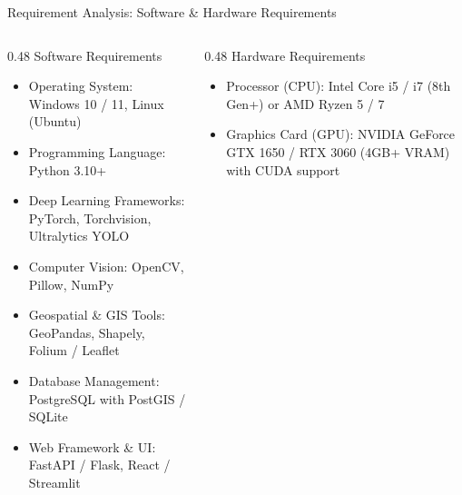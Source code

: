 \documentclass[10pt]{beamer}
\def\\{}%
\def\textbf#1{#1}%
\def\large{}%
\def\begin#1{}%
\def\end#1{}%
\def\vspace#1{}%
\begin{document}
\begin{frame}{Requirement Analysis: Software \& Hardware Requirements}
    \begin{columns}[t]
        \begin{column}{0.48\textwidth}
            \textbf{\large Software Requirements}
            \vspace{0.4em}
            \begin{itemize}
                \setlength{\itemsep}{0.45em}
                \item \textbf{Operating System:} \\ Windows 10 / 11, Linux (Ubuntu)
                \item \textbf{Programming Language:} \\ Python 3.10+
                \item \textbf{Deep Learning Frameworks:} \\ PyTorch, Torchvision, Ultralytics YOLO
                \item \textbf{Computer Vision:} \\ OpenCV, Pillow, NumPy
                \item \textbf{Geospatial \& GIS Tools:} \\ GeoPandas, Shapely, Folium / Leaflet
                \item \textbf{Database Management:} \\ PostgreSQL with PostGIS / SQLite
                \item \textbf{Web Framework \& UI:} \\ FastAPI / Flask, React / Streamlit
            \end{itemize}
        \end{column}
        \begin{column}{0.48\textwidth}
            \textbf{\large Hardware Requirements}
            \vspace{0.4em}
            \begin{itemize}
                \setlength{\itemsep}{0.45em}
                \item \textbf{Processor (CPU):} \\ Intel Core i5 / i7 (8th Gen+) or AMD Ryzen 5 / 7
                \item \textbf{Graphics Card (GPU):} \\ NVIDIA GeForce GTX 1650 / RTX 3060 (4GB+ VRAM) with CUDA support

\end{itemize}
\end{column}
\end{columns}
\end{frame}
\end{document}
